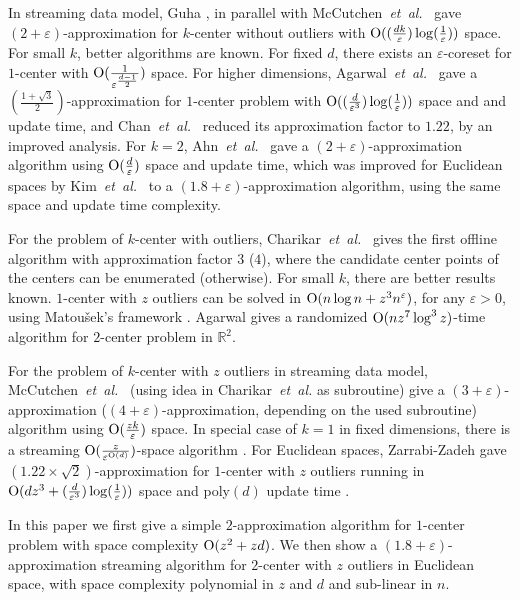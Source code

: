 \documentclass[envcountsame]{cls/cccg15}
\newcommand{\cO}{\ensuremath{{\rm O}}}
\newcommand{\IR}{\ensuremath{\mathbb{R}}}
\newcommand{\eps}{\varepsilon}
\newcommand{\etal}{{\em et~al.\/}}
\begin{document}
In streaming data model, Guha \cite{guha2009tight}, in parallel with McCutchen~\etal~\cite{mccutchen2008streaming} gave $(2+\eps)$-approximation for $k$-center without outliers with $\cO((\frac{dk}{\eps}) \log(\frac{1}{\eps}))$ space.
For small $k$, better algorithms are known. For fixed $d$, there exists an $\eps$\nobreakdash-coreset for $1$-center with $\cO(\frac{1}{\eps^{\frac{d-1}{2}}})$ space.
For higher dimensions, Agarwal~\etal~\cite{agarwal2010streaming} gave a $(\frac{1+\sqrt{3}}{2})$-approximation for $1$\nobreakdash-center problem with $\cO((\frac{d}{\eps^3})\log(\frac{1}{\eps}))$ space and and update time, and Chan~\etal~\cite{chan2014streaming} reduced its approximation factor to $1.22$, by an improved analysis.
For $k=2$, Ahn~\etal~\cite{ahn2014computing} gave a $(2+\eps)$-approximation algorithm using $\cO(\frac{d}{\eps})$ space and update time, which was improved for Euclidean spaces by Kim~\etal~\cite{kim2014improved} to a $(1.8+\eps)$-approximation algorithm, using the same space and update time complexity.

For the problem of $k$-center with outliers, Charikar~\etal~\cite{charikar2001algorithms} gives the first offline algorithm with approximation factor $3$ ($4$), where the candidate center points of the centers can be enumerated (otherwise).
For small $k$, there are better results known. $1$-center with $z$ outliers can be solved in $\cO(n \log n + z^{3} n^{\eps})$, for any $\eps > 0$, using Matou{\v{s}}ek's framework \cite{matouvsek1995geometric}.
Agarwal \cite{agarwal2008efficient} gives a randomized $\cO(n z^{7} \log^3 z)$-time algorithm for $2$-center problem in $\IR^2$.

For the problem of $k$-center with $z$ outliers in streaming data model, McCutchen~\etal~\cite{mccutchen2008streaming} (using idea in Charikar~\etal \cite{charikar2001algorithms} as subroutine) give a $(3+\eps)$-approximation ($(4+\eps)$-approximation, depending on the used subroutine) algorithm using $\cO(\frac{zk}{\eps})$ space.
In special case of $k=1$ in fixed dimensions, there is a streaming $\cO(\frac{z}{\eps^{\cO(d)}})$-space algorithm \cite{agarwal2007space, zarrabi2011almost}.
For Euclidean spaces, Zarrabi-Zadeh \cite{zarrabi2009streaming} gave $(1.22 \times \sqrt{2})$\nobreakdash-approximation for $1$-center with $z$ outliers running in $\cO(dz^3 + (\frac{d}{\eps^3})\log(\frac{1}{\eps}))$ space and poly$(d)$ update time .

In this paper we first give a simple $2$-approximation algorithm for $1$-center problem with space complexity $\cO(z^2 + zd)$. We then show a $(1.8 + \eps)$-approximation streaming algorithm for $2$-center with $z$ outliers in Euclidean space, with space complexity polynomial in $z$ and $d$ and sub-linear in $n$.
\end{document}
